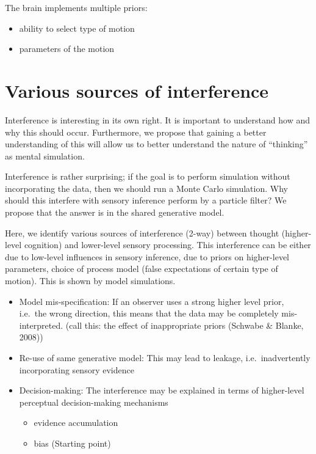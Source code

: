 \documentclass[english,floatsintext,man]{apa6}
\providecommand{\tightlist}{%
  \setlength{\itemsep}{0pt}\setlength{\parskip}{0pt}}
\theoremstyle{definition}
\theoremstyle{definition}
\theoremstyle{remark}
\begin{document}
The brain implements multiple priors:

\begin{itemize}
\tightlist
\item
  ability to select type of motion
\item
  parameters of the motion
\end{itemize}

\section{Various sources of
interference}\label{various-sources-of-interference}

Interference is interesting in its own right. It is important to
understand how and why this should occur. Furthermore, we propose that
gaining a better understanding of this will allow us to better
understand the nature of \enquote{thinking} as mental simulation.

Interference is rather surprising; if the goal is to perform simulation
without incorporating the data, then we should run a Monte Carlo
simulation. Why should this interfere with sensory inference perform by
a particle filter? We propose that the answer is in the shared
generative model.

Here, we identify various sources of interference (2-way) between
thought (higher-level cognition) and lower-level sensory processing.
This interference can be either due to low-level influences in sensory
inference, due to priors on higher-level parameters, choice of process
model (false expectations of certain type of motion). This is shown by
model simulations.

\begin{itemize}
\item
  Model mis-specification: If an observer uses a strong higher level
  prior, i.e.~the wrong direction, this means that the data may be
  completely mis-interpreted. (call this: the effect of inappropriate
  priors (Schwabe \& Blanke, 2008))
\item
  Re-use of same generative model: This may lead to leakage,
  i.e.~inadvertently incorporating sensory evidence
\item
  Decision-making: The interference may be explained in terms of
  higher-level perceptual decision-making mechanisms

  \begin{itemize}
  \tightlist
  \item
    evidence accumulation
  \item
    bias (Starting point)
  \end{itemize}
\end{itemize}
\end{document}
